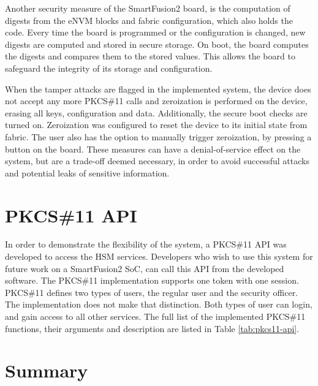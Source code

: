 Another security measure of the SmartFusion2 board, is the computation of digests from the eNVM blocks and fabric configuration, which also holds the code. Every time the board is programmed or the configuration is changed, new digests are computed and stored in secure storage. On boot, the board computes the digests and compares them to the stored values. This allows the board to safeguard the integrity of its storage and configuration.

When the tamper attacks are flagged in the implemented system, the device does not accept any more PKCS\#11 calls and zeroization is performed on the device, erasing all keys, configuration and data. Additionally, the secure boot checks are turned on.
Zeroization was configured to reset the device to its initial state from fabric.
The user also has the option to manually trigger zeroization, by pressing a button on the board.
These measures can have a denial-of-service effect on the system, but are a trade-off deemed necessary, in order to avoid successful attacks and potential leaks of sensitive information.

\section{PKCS\#11 API}\label{chap:implementation:app:pkcs}

In order to demonstrate the flexibility of the system, a PKCS\#11 API was developed to access the HSM services. Developers who wish to use this system for future work on a SmartFusion2 SoC, can call this API from the developed software.
The PKCS\#11 implementation supports one token with one session.
PKCS\#11 defines two types of users, the regular user and the security officer. The implementation does not make that distinction. Both types of user can login, and gain access to all other services.
The full list of the implemented PKCS\#11 functions, their arguments and description are listed in Table \ref{tab:pkcs11-api}.

\section*{Summary}\label{chap:implementation:summary}


